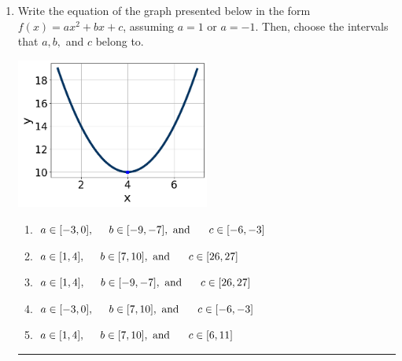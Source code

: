 \documentclass[14pt]{extbook}
\newcommand{\litem}[1]{\item#1\hspace*{-1cm}\rule{\textwidth}{0.4pt}}
\begin{document}
\begin{enumerate}
{\begin{enumerate}[label=\Alph*.]
\end{enumerate} }
\litem{
Write the equation of the graph presented below in the form $f(x)=ax^2+bx+c$, assuming  $a=1$ or $a=-1$. Then, choose the intervals that $a, b,$ and $c$ belong to.
\begin{center}
    \includegraphics[width=0.5\textwidth]{../Figures/quadraticGraphToEquationA.png}
\end{center}
\begin{enumerate}[label=\Alph*.]
\item \( a \in [-3, 0], \hspace*{5mm} b \in [-9, -7], \text{ and } \hspace*{5mm} c \in [-6, -3] \)
\item \( a \in [1, 4], \hspace*{5mm} b \in [7, 10], \text{ and } \hspace*{5mm} c \in [26, 27] \)
\item \( a \in [1, 4], \hspace*{5mm} b \in [-9, -7], \text{ and } \hspace*{5mm} c \in [26, 27] \)
\item \( a \in [-3, 0], \hspace*{5mm} b \in [7, 10], \text{ and } \hspace*{5mm} c \in [-6, -3] \)
\item \( a \in [1, 4], \hspace*{5mm} b \in [7, 10], \text{ and } \hspace*{5mm} c \in [6, 11] \)


\end{enumerate}}
\end{enumerate}
\end{document}
